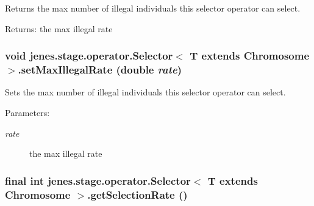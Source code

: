 Returns the max number of illegal individuals this selector operator can select.

\begin{Desc}
\item[Returns:]the max illegal rate \end{Desc}
\hypertarget{classjenes_1_1stage_1_1operator_1_1_selector_3_01_t_01extends_01_chromosome_01_4_68ffd7e37d617f2f71628ce3659a8457}{
\subsubsection[setMaxIllegalRate]{\setlength{\rightskip}{0pt plus 5cm}void jenes.stage.operator.Selector$<$ T extends Chromosome $>$.setMaxIllegalRate (double {\em rate})}}
\label{classjenes_1_1stage_1_1operator_1_1_selector_3_01_t_01extends_01_chromosome_01_4_68ffd7e37d617f2f71628ce3659a8457}


Sets the max number of illegal individuals this selector operator can select.

\begin{Desc}
\item[Parameters:]
\begin{description}
\item[{\em rate}]the max illegal rate \end{description}
\end{Desc}
\hypertarget{classjenes_1_1stage_1_1operator_1_1_selector_3_01_t_01extends_01_chromosome_01_4_17809883b498ec5764c5aa38d04bda8b}{
\subsubsection[getSelectionRate]{\setlength{\rightskip}{0pt plus 5cm}final int jenes.stage.operator.Selector$<$ T extends Chromosome $>$.getSelectionRate ()}}
\label{classjenes_1_1stage_1_1operator_1_1_selector_3_01_t_01extends_01_chromosome_01_4_17809883b498ec5764c5aa38d04bda8b}


